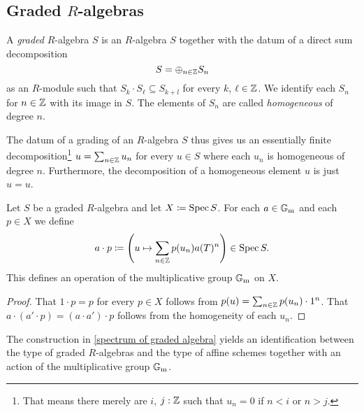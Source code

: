 \subsection{Graded $R$-algebras}

\begin{definition}
  A \emph{graded} $R$-algebra $S$ is an $R$-algebra $S$ together with the datum of a direct sum decomposition
  \begin{equation*}
    S = \oplus_{n \in \mathbb{Z}} S_n
  \end{equation*}
  as an $R$-module such that $S_k \cdot S_\ell \subseteq S_{k + l}$
  for every $k$, $\ell \in \mathbb{Z}$.  We identify each $S_n$ for $n \in \mathbb{Z}$
  with its image in $S$.  The elements of $S_n$ are called \emph{homogeneous} of degree $n$.
\end{definition}

\begin{remark}
  The datum of a grading of an $R$-algebra $S$ thus gives us an
  essentially finite decomposition\footnote{That means there merely
    are $i$, $j :\mathbb{Z}$ such that $u_n = 0$ if $n < i$ or $n > j$.}
  $u = \sum_{n \in \mathbb{Z}} u_n$ for every $u \in S$ where each $u_n$ is
  homogeneous of degree $n$.  Furthermore, the decomposition of a
  homogeneous element $u$ is just $u = u$.
\end{remark}

\begin{proposition}\label{spectrum of graded algebra}
  Let $S$ be a graded $R$-algebra and let $X \coloneqq \operatorname{Spec} S$.  For each $a \in \mathbb{G}_\mathrm{m}$ and each $p \in X$ we define
  \begin{equation*}
    a \cdot p \coloneqq \left(u \mapsto \sum_{n \in \mathbb{Z}} p(u_n) a(T)^n\right) \in \operatorname{Spec} S.
  \end{equation*}
  This defines an operation of the multiplicative group $\mathbb{G}_\mathrm{m}$ on $X$.
\end{proposition}

\begin{proof}
  That $1 \cdot p = p$ for every $p \in X$ follows from
  $p(u) = \sum_{n \in \mathbb{Z}} p(u_n)\cdot 1^n$.  That
  $a \cdot (a' \cdot p) = (a \cdot a') \cdot p$ follows from the
  homogeneity of each $u_n$.
\end{proof}

\begin{theorem}
  The construction in \cref{spectrum of graded algebra} yields an
  identification between the type of graded $R$-algebras and the type
  of affine schemes together with an action of the multiplicative
  group $\mathbb{G}_\mathrm{m}$.
\end{theorem}


